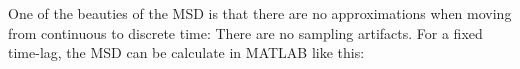 One of the beauties of the MSD is that there are no approximations when moving from continuous to discrete time: There are no sampling artifacts. 
For a fixed time-lag, the MSD can be calculate in MATLAB like this: